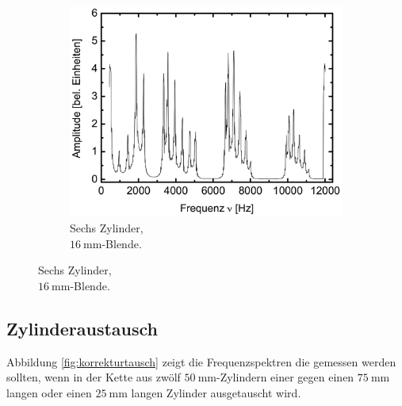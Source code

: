 \begin{figure}
\begin{subfigure}{0.3\textwidth}
    \includegraphics[width=\textwidth]{korrektur/6_50mm_16.png}
    \caption{Sechs Zylinder,\\$\SI{16}{\milli\meter}$-Blende.}
  \end{subfigure}
\end{figure}

\FloatBarrier
\subsection{Zylinderaustausch}
Abbildung \ref{fig:korrekturtausch} zeigt die Frequenzspektren die gemessen werden sollten,
wenn in der Kette aus zwölf $\SI{50}{\milli\meter}$-Zylindern einer gegen einen
$\SI{75}{\milli\meter}$ langen oder einen $\SI{25}{\milli\meter}$ langen Zylinder ausgetauscht wird.

